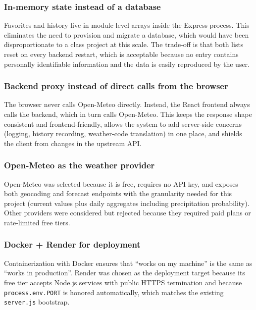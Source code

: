 \documentclass[11pt,letterpaper]{article}
\begin{document}
\subsubsection*{In-memory state instead of a database}
Favorites and history live in module-level arrays inside the Express process. This eliminates the need to provision and migrate a database, which would have been disproportionate to a class project at this scale. The trade-off is that both lists reset on every backend restart, which is acceptable because no entry contains personally identifiable information and the data is easily reproduced by the user.

\subsubsection*{Backend proxy instead of direct calls from the browser}
The browser never calls Open-Meteo directly. Instead, the React frontend always calls the backend, which in turn calls Open-Meteo. This keeps the response shape consistent and frontend-friendly, allows the system to add server-side concerns (logging, history recording, weather-code translation) in one place, and shields the client from changes in the upstream API.

\subsubsection*{Open-Meteo as the weather provider}
Open-Meteo was selected because it is free, requires no API key, and exposes both geocoding and forecast endpoints with the granularity needed for this project (current values plus daily aggregates including precipitation probability). Other providers were considered but rejected because they required paid plans or rate-limited free tiers.

\subsubsection*{Docker + Render for deployment}
Containerization with Docker ensures that ``works on my machine'' is the same as ``works in production''. Render was chosen as the deployment target because its free tier accepts Node.js services with public HTTPS termination and because \texttt{process.env.PORT} is honored automatically, which matches the existing \texttt{server.js} bootstrap.
\end{document}

